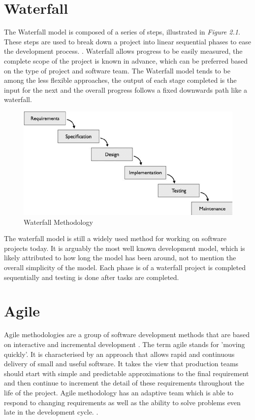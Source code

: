\section{Waterfall}
The Waterfall model is composed of a series of steps, illustrated in \emph{Figure 2.1}. These steps are used to break down a project into linear sequential phases to ease the development process.  \cite{petersen2009waterfall}. Waterfall allows progress to be easily measured, the complete scope of the project is known in advance, which can be preferred based on the type of project and software team. The Waterfall model tends to be among the less flexible approaches, the output of each stage completed is the input for the next and the overall progress follows a fixed downwards path like a waterfall.
\begin{figure}[ht]
    \centering
    \includegraphics[scale=0.46]{img/Waterfall.png}
    \caption{Waterfall Methodology}
    \label{fig:my_label1}
\end{figure}
The waterfall model is still a widely used method for working on software projects today. It is arguably the most well known development model, which is likely attributed to how long the model has been around, not to mention the overall simplicity of the model. Each phase is of a waterfall project is completed sequentially and testing is done after tasks are completed. \cite{balaji2012waterfall}

\section{Agile}
Agile methodologies are a group of software development methods that are based on interactive and incremental development \cite{kumar2012impact}. The term agile stands for 'moving quickly'. It is characterised by an approach that allows rapid and continuous delivery of small and useful software. It takes the view  that production teams should start with simple and predictable approximations to the final requirement and then continue to increment the detail of these requirements throughout the life of the project. Agile methodology has an adaptive team which is able to respond to changing requirements as well as the ability to solve problems even late in the development cycle. \cite{balaji2012waterfall}.

